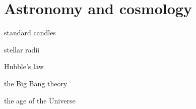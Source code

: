 \documentclass[main.tex]{subfiles}
\begin{document}
\chapter{Astronomy and cosmology}
\begin{content}
    \item standard candles
    \item stellar radii
    \item Hubble’s law
    \item the Big Bang theory
    \item the age of the Universe
\end{content}
\end{document}
